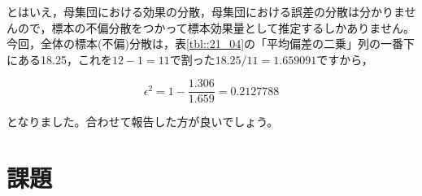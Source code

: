 \documentclass{ltjsarticle}
\begin{document}
とはいえ，母集団における効果の分散，母集団における誤差の分散は分かりませんので，標本の不偏分散をつかって標本効果量として推定するしかありません。今回，全体の標本(不偏)分散は，表\ref{tbl::21_04}の「平均偏差の二乗」列の一番下にある18.25，これを$12-1=11$で割った$18.25/11=1.659091$ですから，

$$\epsilon^2 = 1 - \frac{1.306}{1.659} = 0.2127788 $$

となりました。合わせて報告した方が良いでしょう。

\section{課題}
\end{document}

